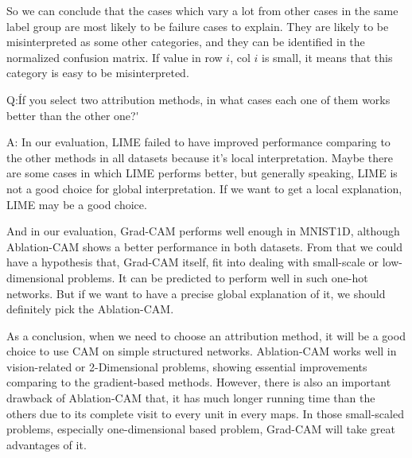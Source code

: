 \documentclass[conference]{IEEEtran}
\begin{document}
So we can conclude that the cases which vary a lot from other cases in the same label group are most likely to be failure cases to explain. They are likely to be misinterpreted as some other categories, and they can be identified in the normalized confusion matrix. If value in row $i$, col $i$ is small, it means that this category is easy to be misinterpreted.
\par
Q:\'If you select two attribution methods, in what cases each one of them works better than the other one?\'\par
A: In our evaluation, LIME failed to have improved performance comparing to the other methods in all datasets because it's local interpretation. 
Maybe there are some cases in which LIME performs better, but generally speaking, LIME is not a good choice for global interpretation. 
If we want to get a local explanation, LIME may be a good choice.\par
And in our evaluation, Grad-CAM performs well enough in MNIST1D, although Ablation-CAM shows a better performance in both datasets. 
From that we could have a hypothesis that, Grad-CAM itself,  fit into dealing with small-scale or low-dimensional problems. 
It can be predicted to perform well in such one-hot networks.  But if we want to have a precise global explanation of it, we should definitely pick the Ablation-CAM.
\par
As a conclusion, when we need to choose an attribution method, it will be a good choice to use CAM on simple structured networks. 
Ablation-CAM works well in vision-related or 2-Dimensional problems, showing essential improvements comparing to the gradient-based methods. 
However, there is also an important drawback of Ablation-CAM that, it has much longer running time than the others due to its complete visit to every unit in every maps. 
In those small-scaled problems, especially one-dimensional based problem, Grad-CAM will take great advantages of it.
\par
\end{document}
